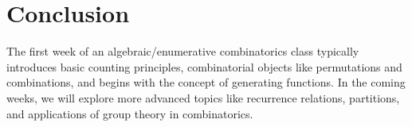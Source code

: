 \documentclass{article}
\begin{document}
\section{Conclusion}
The first week of an algebraic/enumerative combinatorics class typically introduces basic counting principles, combinatorial objects like permutations and combinations, and begins with the concept of generating functions. In the coming weeks, we will explore more advanced topics like recurrence relations, partitions, and applications of group theory in combinatorics.
\end{document}
